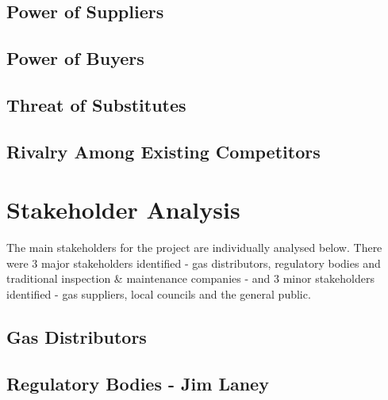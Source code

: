 \documentclass[11pt]{article}		%
\begin{document}
		\subsection[Power of Suppliers]{Power of Suppliers}
		
		\subsection[Power of Buyers]{Power of Buyers}
		
		\subsection[Threat of Substitutes]{Threat of Substitutes}

		\subsection[Rivalry Among Existing Competitors]{Rivalry Among Existing Competitors}
		
	\section{Stakeholder Analysis}
	
		The main stakeholders for the project are individually analysed below.
		There were 3 major stakeholders identified - gas distributors, regulatory bodies and traditional inspection \& maintenance companies - and 3 minor stakeholders identified - gas suppliers, local councils and the general public.
		
		\subsection[Gas Distributors]{Gas Distributors}
		
		\subsection[Regulatory Bodies]{Regulatory Bodies - Jim Laney}
			
\end{document}
